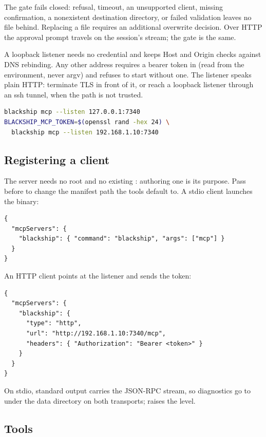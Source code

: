 The gate fails closed: refusal, timeout, an unsupported client, missing
confirmation, a nonexistent destination directory, or failed validation leaves
no file behind. Replacing a file requires an additional overwrite decision.
Over HTTP the approval prompt travels on the session's stream; the gate is the
same.

A loopback listener needs no credential and keeps Host and Origin checks
against DNS rebinding. Any other address requires a bearer token in
 (read from the environment, never argv) and
refuses to start without one. The listener speaks plain HTTP: terminate TLS in
front of it, or reach a loopback listener through an ssh tunnel, when the path
is not trusted.

\begin{lstlisting}[language=bash]
blackship mcp --listen 127.0.0.1:7340
BLACKSHIP_MCP_TOKEN=$(openssl rand -hex 24) \
  blackship mcp --listen 192.168.1.10:7340
\end{lstlisting}

\subsection{Registering a client}

The server needs no root and no existing : authoring one is
its purpose. Pass \command{--config <path>} before \command{mcp} to change the
manifest path the tools default to. A stdio client launches the binary:

\begin{lstlisting}
{
  "mcpServers": {
    "blackship": { "command": "blackship", "args": ["mcp"] }
  }
}
\end{lstlisting}

An HTTP client points at the listener and sends the token:

\begin{lstlisting}
{
  "mcpServers": {
    "blackship": {
      "type": "http",
      "url": "http://192.168.1.10:7340/mcp",
      "headers": { "Authorization": "Bearer <token>" }
    }
  }
}
\end{lstlisting}

On stdio, standard output carries the JSON-RPC stream, so diagnostics go to
\file{mcp.log} under the data directory on both transports; 
raises the level.

\subsection{Tools}

